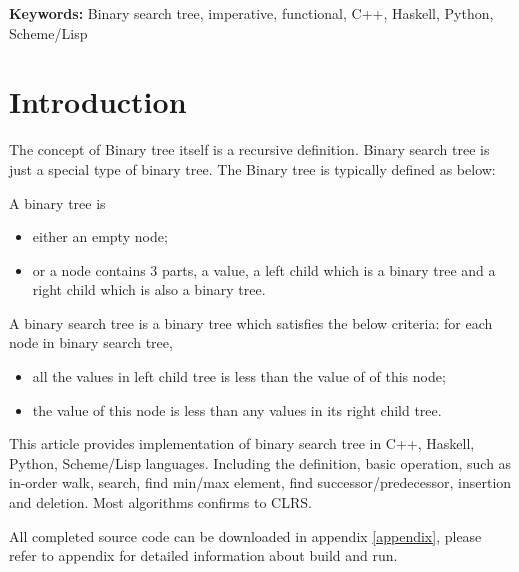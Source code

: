 \documentclass{article}
\begin{document}
\vspace{3cm}
{\bfseries Keywords:} Binary search tree, imperative, functional, C++, Haskell, Python, Scheme/Lisp


\maketitle

\section{Introduction}
\label{introduction}

The concept of Binary tree itself is a recursive definition. Binary search tree is just a special type of
binary tree. The Binary tree is typically defined as below:

A binary tree is 
\begin{itemize}
\item either an empty node;
\item or a node contains 3 parts, a value, a left child which is a binary tree and a right child which is also a binary tree.
\end{itemize}

A binary search tree is a binary tree which satisfies the below criteria:
for each node in binary search tree,
\begin{itemize}
\item all the values in left child tree is less than the value of of this node;
\item the value of this node is less than any values in its right child tree.
\end{itemize}

This article provides implementation of binary search tree in C++, Haskell, Python, 
Scheme/Lisp languages. Including the definition, basic operation, such as
in-order walk, search, find min/max element, find successor/predecessor, insertion
and deletion. Most algorithms confirms to CLRS\cite{CLRS}.

All completed source code can be downloaded in appendix \ref{appendix}, please refer to appendix
for detailed information about build and run.

\end{document}
